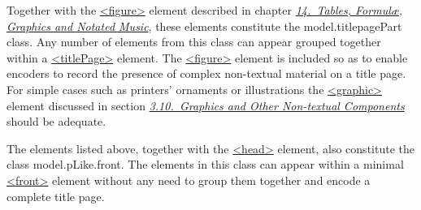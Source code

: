 \par
Together with the \hyperref[TEI.figure]{<figure>} element described in chapter \textit{\hyperref[FT]{14.\ Tables, Formulæ, Graphics and Notated Music}}, these elements constitute the \textsf{model.titlepagePart} class. Any number of elements from this class can appear grouped together within a \hyperref[TEI.titlePage]{<titlePage>} element. The \hyperref[TEI.figure]{<figure>} element is included so as to enable encoders to record the presence of complex non-textual material on a title page. For simple cases such as printers' ornaments or illustrations the \hyperref[TEI.graphic]{<graphic>} element discussed in section \textit{\hyperref[COGR]{3.10.\ Graphics and Other Non-textual Components}} should be adequate.\par
The elements listed above, together with the \hyperref[TEI.head]{<head>} element, also constitute the class \textsf{model.pLike.front}. The elements in this class can appear within a minimal \hyperref[TEI.front]{<front>} element without any need to group them together and encode a complete title page.\par
